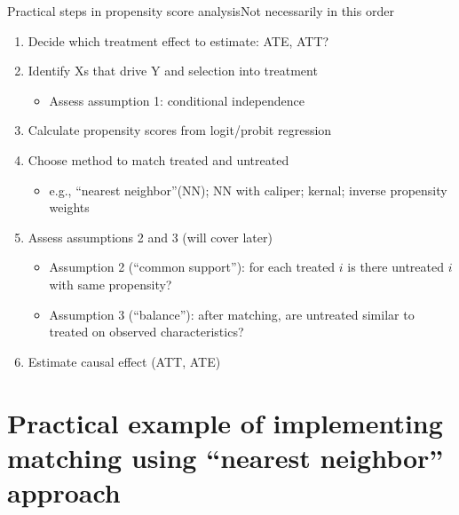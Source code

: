 \begin{frame}{Practical steps in propensity score analysis}{Not necessarily in this order}
	
	\begin{enumerate}
		\item Decide which treatment effect to estimate: ATE, ATT?
		\item Identify Xs that drive Y and selection into treatment
		\begin{itemize}
			\item Assess assumption 1: conditional independence
		\end{itemize}
		\item Calculate propensity scores from logit/probit regression
		\item Choose method to match treated and untreated
		\begin{itemize}
			\item e.g., ``nearest neighbor''(NN); NN with caliper; kernal; inverse propensity weights
		\end{itemize}
		\item Assess assumptions 2 and 3 (will cover later)
		\begin{itemize}
			\item Assumption 2 (``common support''): for each treated $i$ is there untreated $i$ with same propensity?
			\item Assumption 3 (``balance''): after matching, are untreated similar to treated on observed characteristics?
		\end{itemize}
		\item Estimate causal effect (ATT, ATE)
	\end{enumerate}
\end{frame}

\section[Practical example]{Practical example of implementing matching using ``nearest neighbor'' approach}


